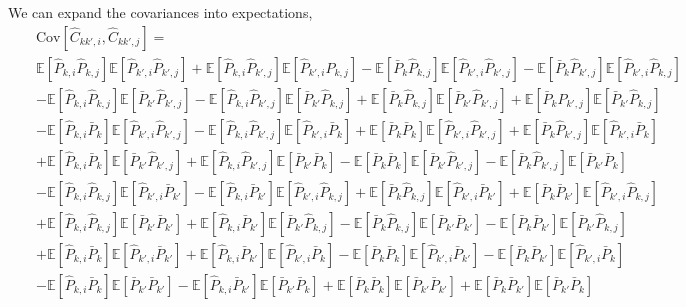 \documentclass{aastex6}
\newcommand{\EE}{\mathbb{E}}
\newcommand{\eqn}[1]{\begin{eqnarray}#1\end{eqnarray}}
\begin{document}
We can expand the covariances into expectations,
\eqn{
	 && \mathrm{Cov}[\hat{C}_{kk',i} , \hat{C}_{kk',j} ] =  \\
	 && 
	  \EE[\hat{P}_{k, i}\hat{P}_{k, j}] \EE[\hat{P}_{k', i}\hat{P}_{k', j} ] 
	+	  \EE[\hat{P}_{k, i}\hat{P}_{k', j} ] \EE[\hat{P}_{k', i} \hat{P}_{k, j}] 
	  - \EE[ \bar{P}_{k}\hat{P}_{k, j}] \EE[\hat{P}_{k', i} \hat{P}_{k', j} ] 
	  -  \EE[ \bar{P}_{k} \hat{P}_{k', j} ] \EE[\hat{P}_{k', i} \hat{P}_{k, j}] \\
	&&	  - \EE[ \hat{P}_{k, i}\hat{P}_{k, j}]  \EE[ \bar{P}_{k'} \hat{P}_{k', j} ] 
	  - \EE[ \hat{P}_{k, i}\hat{P}_{k', j}]  \EE[  \bar{P}_{k'} \hat{P}_{k, j}] 
	 + \EE[\bar{P}_{k}\hat{P}_{k, j}]  \EE[ \bar{P}_{k'} \hat{P}_{k', j} ]	
	  + \EE[\bar{P}_{k} \hat{P}_{k', j} ]  \EE[\bar{P}_{k'} \hat{P}_{k, j} ]	\\
	&& - \EE[\hat{P}_{k, i} \bar{P}_{k}]  \EE[ \hat{P}_{k', i} \hat{P}_{k', j} ] 
	 - \EE[\hat{P}_{k, i} \hat{P}_{k', j} ]  \EE[\hat{P}_{k', i} \bar{P}_{k} ] 
	+ \EE[ \bar{P}_{k} \bar{P}_{k}] \EE[ \hat{P}_{k', i} \hat{P}_{k', j} ] 
	 + \EE[ \bar{P}_{k} \hat{P}_{k', j}]  \EE[  \hat{P}_{k', i} \bar{P}_{k}] \\
	&& + \EE[\hat{P}_{k, i} \bar{P}_{k}]  \EE[ \bar{P}_{k'} \hat{P}_{k', j} ] 
	 + \EE[\hat{P}_{k, i} \hat{P}_{k', j}]  \EE[  \bar{P}_{k'} \bar{P}_{k}] 
	 - \EE[\bar{P}_{k} \bar{P}_{k}]  \EE[ \bar{P}_{k'} \hat{P}_{k', j} ]
	 - \EE[\bar{P}_{k} \hat{P}_{k', j} ]  \EE[\bar{P}_{k'} \bar{P}_{k} ] \\
	&& - \EE[\hat{P}_{k, i} \hat{P}_{k, j}]  \EE[ \hat{P}_{k', i} \bar{P}_{k'}] 
	 - \EE[\hat{P}_{k, i} \bar{P}_{k'} ]  \EE[\hat{P}_{k', i} \hat{P}_{k, j}] 
	 + \EE[ \bar{P}_{k} \hat{P}_{k, j}]  \EE[ \hat{P}_{k', i} \bar{P}_{k'}] 
	 + \EE[ \bar{P}_{k} \bar{P}_{k'}] \EE[ \hat{P}_{k', i} \hat{P}_{k, j}] \\
	&& + \EE[\hat{P}_{k, i}  \hat{P}_{k, j} ]  \EE[\bar{P}_{k'}\bar{P}_{k'}] 
	 + \EE[\hat{P}_{k, i} \bar{P}_{k'}]  \EE[ \bar{P}_{k'} \hat{P}_{k, j}] 
	 -\EE[\bar{P}_{k} \hat{P}_{k, j}]  \EE[ \bar{P}_{k'} \bar{P}_{k'}]
	 -\EE[\bar{P}_{k} \bar{P}_{k'}] \EE[ \bar{P}_{k'} \hat{P}_{k, j}]\\
	&& +  \EE[\hat{P}_{k, i} \bar{P}_{k} ]  \EE[\hat{P}_{k', i} \bar{P}_{k'}] 
	+  \EE[\hat{P}_{k, i} \bar{P}_{k'} ]  \EE[\hat{P}_{k', i} \bar{P}_{k}] 
	- \EE[ \bar{P}_{k} \bar{P}_{k} ] \EE[\hat{P}_{k', i}  \bar{P}_{k'} ] 
	- \EE[ \bar{P}_{k} \bar{P}_{k'} ]  \EE[\hat{P}_{k', i}  \bar{P}_{k} ] \\
	&&- \EE[\hat{P}_{k, i} \bar{P}_{k} ]  \EE[\bar{P}_{k'}  \bar{P}_{k'}] 
	- \EE[\hat{P}_{k, i} \bar{P}_{k'} ]  \EE[\bar{P}_{k'} \bar{P}_{k}] 
	+ \EE[\bar{P}_{k}  \bar{P}_{k} ]  \EE[\bar{P}_{k'} \bar{P}_{k'}]
	+ \EE[\bar{P}_{k} \bar{P}_{k'} ]  \EE[\bar{P}_{k'}  \bar{P}_{k}]
	  }
\end{document}
